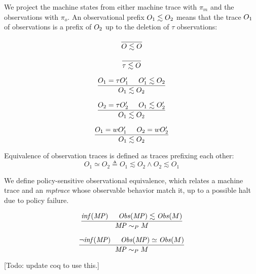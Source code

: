 \documentclass[conference]{IEEEtran}
\begin{document}
    We project the machine states from either machine trace with \(\pi_m\) and the observations with \(\pi_o\).
    An observational prefix \(O_1 \lesssim O_2\) means that the trace \(O_1\) of observations is
    a prefix of \(O_2\) up to the deletion of \(\tau\) observations:

    \[\frac{}
           {O \lesssim O}\]

    \[\frac{}
           {\tau \lesssim O}\]

    \[\frac{O_1 = \tau O_1' \hspace{.5cm} O_1' \lesssim O_2}
           {O_1 \lesssim O_2}\]

    \[\frac{O_2 = \tau O_2' \hspace{.5cm} O_1 \lesssim O_2'}
           {O_1 \lesssim O_2}\]

    \[\frac{O_1 = w O_1' \hspace{.5cm} O_2 = w O_2'}
           {O_1 \lesssim O_2}\]
           
    
    Equivalence of observation traces is defined as traces prefixing each other:
    \[O_1 \simeq O_2 \triangleq O_1 \lesssim O_2 \land O_2 \lesssim O_1\]
    

    We define policy-sensitive observational equivalence, which relates a machine trace and
    an {\it mptrace} whose observable behavior match it, up to a possible halt due to policy failure.

    \[\frac{\mathit{inf}(\mathit{MP}) \hspace{.5cm} \mathit{Obs}(\mathit{MP}) \lesssim \mathit{Obs}(M)}
           {\mathit{MP} \sim_P M}\]
    
    \[\frac{\neg \mathit{inf}(\mathit{MP}) \hspace{.5cm} \mathit{Obs}(\mathit{MP}) \simeq \mathit{Obs}(M)}
           {\mathit{MP} \sim_P M}\]

    [Todo: update coq to use this.]
    
\end{document}
